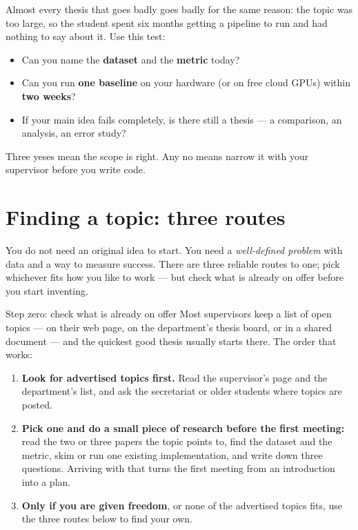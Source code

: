 \documentclass[11pt,a4paper]{article}
\begin{document}
Almost every thesis that goes badly goes badly for the same reason: the topic
was too large, so the student spent six months getting a pipeline to run and
had nothing to say about it. Use this test:

\begin{itemize}
  \item Can you name the \textbf{dataset} and the \textbf{metric} today?
  \item Can you run \textbf{one baseline} on your hardware (or on free cloud
        GPUs) within \textbf{two weeks}?
  \item If your main idea fails completely, is there still a thesis ---
        a comparison, an analysis, an error study?
\end{itemize}

Three yeses mean the scope is right. Any no means narrow it with your
supervisor before you write code.

\section{Finding a topic: three routes}
\label{sec:topic}

You do not need an original idea to start. You need a \emph{well-defined
problem} with data and a way to measure success. There are three reliable
routes to one; pick whichever fits how you like to work --- but check what is
already on offer before you start inventing.

\begin{cbox}{Step zero: check what is already on offer}
Most supervisors keep a list of open topics --- on their web page, on the
department's thesis board, or in a shared document --- and the quickest good
thesis usually starts there. The order that works:
\begin{enumerate}
  \item \textbf{Look for advertised topics first.} Read the supervisor's page
        and the department's list, and ask the secretariat or older students
        where topics are posted.
  \item \textbf{Pick one and do a small piece of research before the first
        meeting:} read the two or three papers the topic points to, find the
        dataset and the metric, skim or run one existing implementation, and
        write down three questions. Arriving with that turns the first meeting
        from an introduction into a plan.
  \item \textbf{Only if you are given freedom}, or none of the advertised
        topics fits, use the three routes below to find your own.
\end{enumerate}
\end{cbox}
\end{document}
